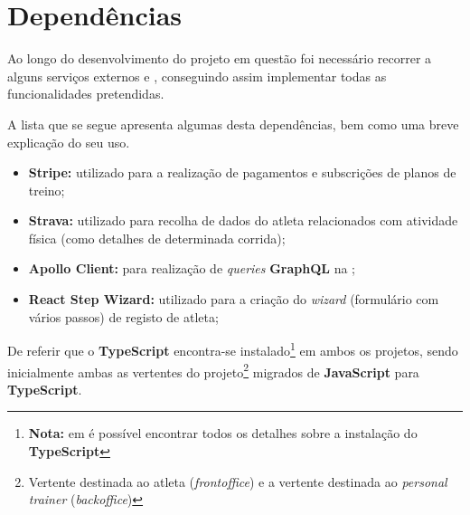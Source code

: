 \section{Dependências}

Ao longo do desenvolvimento do projeto em questão foi necessário recorrer a alguns serviços externos e , conseguindo assim implementar todas as funcionalidades pretendidas.

A lista que se segue apresenta algumas desta dependências, bem como uma breve explicação do seu uso.

\begin{itemize}
	\item \textbf{Stripe:} utilizado para a realização de pagamentos e subscrições de planos de treino;
	\item \textbf{Strava:} utilizado para recolha de dados do atleta relacionados com atividade física (como detalhes de determinada corrida);
	\item \textbf{Apollo Client:} para realização de \textit{queries} \textbf{GraphQL} na ;
	\item \textbf{React Step Wizard:} utilizado para a criação do \textit{wizard} (formulário com vários passos) de registo de atleta;
\end{itemize}

De referir que o \textbf{TypeScript} encontra-se instalado\footnote{\textbf{Nota:} em  é possível encontrar todos os detalhes sobre a instalação do \textbf{TypeScript}} em ambos os projetos, sendo inicialmente ambas as vertentes do projeto\footnote{Vertente destinada ao atleta (\textit{frontoffice}) e a vertente destinada ao \textit{personal trainer} (\textit{backoffice})} migrados de \textbf{JavaScript} para \textbf{TypeScript}.